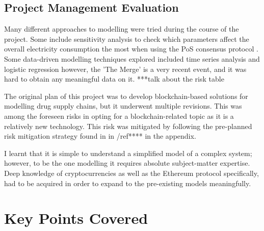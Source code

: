 \subsection{Project Management Evaluation}

Many different approaches to modelling were tried during the course of the project. Some include sensitivity analysis to check which parameters affect the overall electricity consumption the most when using the PoS consensus protocol \cite{MarionAnModelling}. Some data-driven modelling techniques explored included time series analysis and logistic regression \cite{IbanezTheExpansion} however, the 'The Merge' is a very recent event, and it was hard to obtain any meaningful data on it.  ***talk about the risk table

The original plan of this project was to develop blockchain-based solutions for modelling drug supply chains, but it underwent multiple revisions. This was among the foreseen risks in opting for a blockchain-related topic as it is a relatively new technology. This risk was mitigated by following the pre-planned risk mitigation strategy found in in /ref**** in the appendix.

I learnt that it is simple to understand a simplified model of a complex system; however, to be the one modelling it requires absolute subject-matter expertise. Deep knowledge of cryptocurrencies as well as the Ethereum protocol specifically, had to be acquired in order to expand to the pre-existing models meaningfully. 

\section{Key Points Covered}
